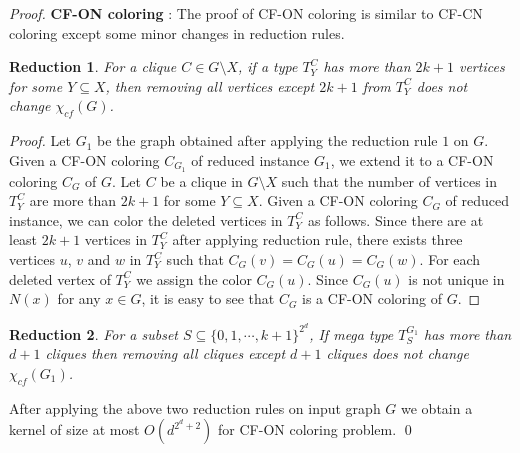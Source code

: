 \documentclass[svgnames]{llncs}
\newtheorem{Reduction}{Reduction}
\newcommand{\cfcn}{\textsc {CF-CN}}
\newcommand{\cfon}{\textsc {CF-ON}}
\begin{document}
\begin{proof}
\par {\bf \cfon{} coloring} :
The proof of \cfon{} coloring is similar to \cfcn{} coloring except some minor changes in reduction rules.

\setcounter{Reduction}{0}
\begin{Reduction}
For a clique $C \in G \setminus X$, if a type $T_Y^C$ has more than $2k+1$ vertices for some $Y \subseteq X$, then removing
all vertices except $2k+1$ from $T_Y^C$ does not change $ \chi_{cf} (G)$. 
\end{Reduction}
\begin{proof}
Let $G_1$ be the graph obtained after applying the reduction rule $1$ on $G$.
Given a \cfon{} coloring $C_{G_1}$ of reduced instance $G_1$, we extend it to a \cfon{} coloring $C_G$ of $G$.
Let $C$ be a clique in $G \setminus X$ such that the number of vertices in $T_Y^C$ are more than $2k+1$ for some $Y \subseteq X$.
Given a \cfon{} coloring $C_G$ of reduced instance, we can color the  deleted vertices in $T_Y^C$ as follows.
Since there are at least $2k+1$ vertices in $T_Y^C$ after applying reduction rule, 
there exists three vertices $u$, $v$ and $w$ in $T_Y^C$ such that $C_G(v)=C_G(u)=C_G(w)$. 
For each deleted vertex of $T_Y^C$ we assign the color $C_G(u)$. 
Since $C_G(u)$ is not unique in $N(x)$ for any $x \in G$, 
it is easy to see that $C_G$ is a \cfon{} coloring of $G$.
\end{proof}

 \begin{Reduction}
For a subset $S \subseteq \{0,1, \cdots, k+1\}^{2^d}$, If  mega type $T_S^{G_1}$ has more than $d+1$ cliques then removing all cliques except $d+1$ cliques does not change $ \chi_{cf} (G_1)$.
\end{Reduction}

After applying the above two reduction rules on input graph $G$ we obtain a kernel of size at most 
$O(d^{2^d+2})$ for \cfon{} coloring problem.   \qed
\end{proof}
\end{document}
